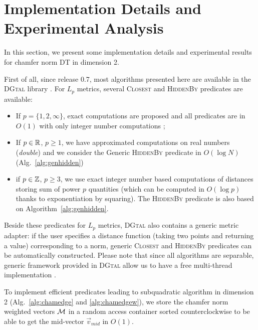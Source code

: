 \documentclass{llncs}
\begin{document}
\section{Implementation Details and Experimental Analysis}
\label{sec:exper-analys}

In this section, we present some implementation details and
experimental results for chamfer norm DT in dimension 2.

First of all, since release 0.7, most algorithms presented here are
available in the \textsc{DGtal} library \cite{dgtal}. For $L_p$
metrics, several \textsc{Closest} and \textsc{HiddenBy} predicates are
available:
\begin{itemize}
\item If $p=\{1,2,\infty\}$, exact computations are proposed and all
  predicates are in $O(1)$ with only integer number computations
  \cite{Hirata1996,Maurer2003,roerdnik};
\item If $p\in {\mathbb{R}}$,  $p\geq 1$, we have approximated computations
  on real numbers (\emph{double}) and we consider the Generic
  \textsc{HiddenBy} predicate in $O(\log N)$
  (Alg.~\ref{alg:genhidden})\;
\item if $p\in {\mathbb{Z}}$, $p\geq 3$, we use exact integer number based
  computations of distances  storing sum of power $p$ quantities (which can be
  computed in $O(\log{p})$ thanks to exponentiation by squaring). The
  \textsc{HiddenBy} predicate is also based on Algorithm~\ref{alg:genhidden}.
\end{itemize}

Beside these predicates for $L_p$ metrics, \textsc{DGtal} also
contains a generic metric adapter: if the user specifies a distance
function (taking two points and returning a value) corresponding to a
norm, generic \textsc{Closest} and \textsc{HiddenBy} predicates can be
automatically constructed. Please note that since all algorithms are
separable, generic framework provided in \textsc{DGtal} allow us to
have a free multi-thread implementation \cite{dcoeurjo_ChapDTWADGMM}.

To implement efficient predicates leading to subquadratic algorithm in
dimension 2 (Alg.~\ref{alg:chamedge} and \ref{alg:chamedgew}), we
store the chamfer norm weighted vectors $\mathcal{M}$ in a random access
container sorted counterclockwise to be able to get the mid-vector
$\vec{v}_{mid}$ in $O(1)$.
\end{document}
